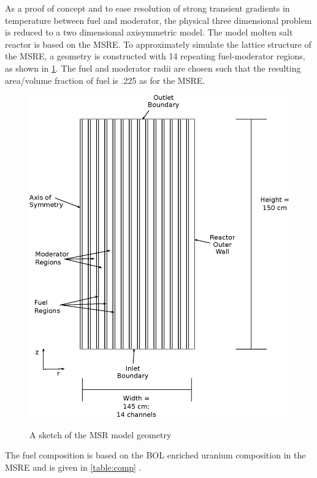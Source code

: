 \documentclass{article}
\begin{document}
As a proof of concept and to ease resolution of strong transient gradients in
temperature between fuel and moderator, the physical three dimensional problem
is reduced to a two dimensional axisymmetric model. The model molten salt
reactor is based on the \gls{MSRE}. To approximately simulate the lattice
structure of the \gls{MSRE}, a geometry is constructed with 14 repeating
fuel-moderator regions, as shown in \cref{fig:geom}. The fuel and moderator
radii are chosen such that the resulting area/volume fraction of fuel is .225 as
for the \gls{MSRE}.

\begin{figure}
  \centering
  \includegraphics{geometry.eps}
  \label{fig:geom}
  \caption{A sketch of the \gls{MSR} model geometry}
\end{figure}


The fuel composition is based on the \gls{BOL} enriched uranium composition in the \gls{MSRE}
and is given in \cref{table:comp} \cite{robertson_msre_1965}.
\end{document}

